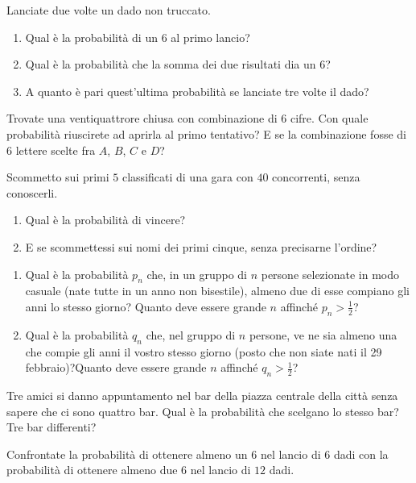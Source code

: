 \Esercizio{}

Lanciate due volte un dado non truccato.
\begin{enumerate}
	\item Qual è la probabilità di un $6$ al primo lancio?
	\item Qual è la probabilità che la somma dei due risultati dia un $6$?
	\item A quanto è pari quest'ultima probabilità se lanciate tre volte il dado?
\end{enumerate}

\Esercizio{}

Trovate una ventiquattrore chiusa con combinazione di $6$ cifre. Con quale probabilità riuscirete ad aprirla al primo tentativo? E se la combinazione fosse di $6$ lettere scelte fra $A$, $B$, $C$ e $D$?

\Esercizio{}

Scommetto sui primi $5$ classificati di una gara con $40$ concorrenti, senza conoscerli.
\begin{enumerate}
	\item Qual è la probabilità di vincere?
	\item E se scommettessi sui nomi dei primi cinque, senza precisarne l'ordine?
\end{enumerate}


\begin{enumerate}
	\item Qual è la probabilità $p_{n}$ che, in un gruppo di $n$ persone selezionate in modo casuale (nate tutte in un anno non bisestile), almeno due di esse compiano gli anni lo stesso giorno? Quanto deve essere grande $n$ affinché $p_{n}  >\frac{1}{2}$?
	\item Qual è la probabilità $q_{n}$ che, nel gruppo di $n$ persone, ve ne sia almeno una che compie gli anni il vostro stesso giorno (posto che non siate nati il 29 febbraio)?Quanto deve essere grande $n$ affinché $q_{n}  >\frac{1}{2}$?
\end{enumerate}

\Esercizio{}

Tre amici si danno appuntamento nel bar della piazza centrale della città senza sapere che ci sono quattro bar. Qual è la probabilità che scelgano lo stesso bar? Tre bar differenti?

\Esercizio{}

Confrontate la probabilità di ottenere almeno un $6$ nel lancio di $6$ dadi con la probabilità di ottenere almeno due $6$ nel lancio di $12$ dadi.

